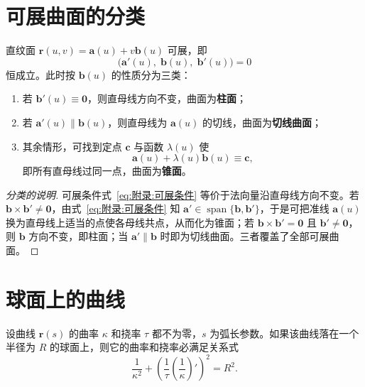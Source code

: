 \section{可展曲面的分类}

\begin{proposition}[可展条件与三种类型]
	直纹面 $\boldsymbol{r}(u,v)=\boldsymbol{a}(u)+v\boldsymbol{b}(u)$ 可展，即
	\begin{equation}
		\bigl(\boldsymbol{a}'(u),\;\boldsymbol{b}(u),\;\boldsymbol{b}'(u)\bigr)=0
		\label{eq:附录:可展条件}
	\end{equation}
	恒成立。此时按 $\boldsymbol{b}(u)$ 的性质分为三类：
	\begin{enumerate}
		\item 若 $\boldsymbol{b}'(u)\equiv\boldsymbol{0}$，则直母线方向不变，曲面为\textbf{柱面}；
		\item 若 $\boldsymbol{a}'(u)\parallel\boldsymbol{b}(u)$，则直母线为 $\boldsymbol{a}(u)$ 的切线，曲面为\textbf{切线曲面}；
		\item 其余情形，可找到定点 $\boldsymbol{c}$ 与函数 $\lambda(u)$ 使
		\begin{equation}
			\boldsymbol{a}(u)+\lambda(u)\boldsymbol{b}(u)\equiv\boldsymbol{c},
			\label{eq:附录:锥面顶点}
		\end{equation}
		即所有直母线过同一点，曲面为\textbf{锥面}。
	\end{enumerate}
\end{proposition}

\begin{proof}[分类的说明]
	可展条件式~\eqref{eq:附录:可展条件} 等价于法向量沿直母线方向不变。若 $\boldsymbol{b}\times\boldsymbol{b}'\neq\boldsymbol{0}$，由式~\eqref{eq:附录:可展条件} 知 $\boldsymbol{a}'\in\operatorname{span}\{\boldsymbol{b},\boldsymbol{b}'\}$，于是可把准线 $\boldsymbol{a}(u)$ 换为直母线上适当的点使各母线共点，从而化为锥面；若 $\boldsymbol{b}\times\boldsymbol{b}'=\boldsymbol{0}$ 且 $\boldsymbol{b}'\neq\boldsymbol{0}$，则 $\boldsymbol{b}$ 方向不变，即柱面；当 $\boldsymbol{a}'\parallel\boldsymbol{b}$ 时即为切线曲面。三者覆盖了全部可展曲面。
\end{proof}

\section{球面上的曲线}

\begin{theorem}[球面曲线的曲率挠率关系]
	设曲线 $\boldsymbol{r}(s)$ 的曲率 $\kappa$ 和挠率 $\tau$ 都不为零，$s$ 为弧长参数。如果该曲线落在一个半径为 $R$ 的球面上，则它的曲率和挠率必满足关系式
	\begin{equation}
		\frac{1}{\kappa^{2}}+\left(\frac{1}{\tau}\left(\frac{1}{\kappa}\right)'\right)^{2}=R^{2}.
		\label{eq:附录:球面曲线关系}
	\end{equation}
\end{theorem}

